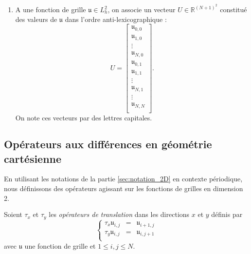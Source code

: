 \begin{enumerate}
\item A une fonction de grille $\mathfrak{u} \in L^2_h$, on associe un vecteur $U \in \mathbb{R}^{(N+1)^2}$ constitué des valeurs de $\mathfrak{u}$ dans l'ordre anti-lexicographique :
\begin{equation}
U = \begin{bmatrix}
\mathfrak{u}_{0,0}\\
\mathfrak{u}_{1,0}\\
\vdots \\
\mathfrak{u}_{N,0}\\
\mathfrak{u}_{0,1}\\
\mathfrak{u}_{1,1}\\
\vdots \\
\mathfrak{u}_{N,1}\\
\vdots \\
\mathfrak{u}_{N,N}\\
\end{bmatrix}.
\end{equation}
On note ces vecteurs par des lettres capitales.
\end{enumerate}















%
\subsection{Opérateurs aux différences en géométrie cartésienne}

En utilisant les notations de la partie \ref{sec:notation_2D} en contexte périodique, nous définissons des opérateurs agissant sur les fonctions de grilles en dimension 2.

\begin{definition}
Soient $\tau_x$ et $\tau_y$ les \textit{opérateurs de translation} dans les directions $x$ et $y$ définis par
\begin{equation}
\left\lbrace
\begin{array}{rcl}
\tau_x \mathfrak{u}_{i,j} & = & \mathfrak{u}_{i+1,j}\\
\tau_y \mathfrak{u}_{i,j} & = & \mathfrak{u}_{i,j+1}\\
\end{array}
\right.
\end{equation}
avec $\mathfrak{u}$ une fonction de grille et $1 \leq i,j \leq N$.
\end{definition}

